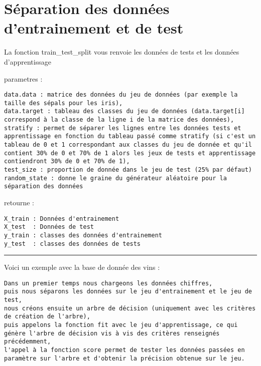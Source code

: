 \documentclass[11pt]{article}
\begin{document}
    \section{Séparation des données d'entrainement et de
test}\label{suxe9paration-des-donnuxe9es-dentrainement-et-de-test}

La fonction train\_test\_split vous renvoie les données de tests et les
données d'apprentissage

parametres :

\begin{verbatim}
data.data : matrice des données du jeu de données (par exemple la taille des sépals pour les iris),
data.target : tableau des classes du jeu de données (data.target[i] correspond à la classe de la ligne i de la matrice des données),
stratify : permet de séparer les lignes entre les données tests et apprentissage en fonction du tableau passé comme stratify (si c'est un tableau de 0 et 1 correspondant aux classes du jeu de donnée et qu'il contient 30% de 0 et 70% de 1 alors les jeux de tests et apprentissage contiendront 30% de 0 et 70% de 1),
test_size : proportion de donnée dans le jeu de test (25% par défaut)
random_state : donne le graine du générateur aléatoire pour la séparation des données
\end{verbatim}

retourne :

\begin{verbatim}
X_train : Données d'entrainement
X_test  : Données de test
y_train : classes des données d'entrainement
y_test  : classes des données de tests
\end{verbatim}

\begin{center}\rule{0.5\linewidth}{\linethickness}\end{center}

Voici un exemple avec la base de donnée des vins :

\begin{verbatim}
Dans un premier temps nous chargeons les données chiffres, 
puis nous séparons les données sur le jeu d'entrainement et le jeu de test,
nous créons ensuite un arbre de décision (uniquement avec les critères de création de l'arbre),
puis appelons la fonction fit avec le jeu d'apprentissage, ce qui génère l'arbre de décision vis à vis des critères renseignés précédemment,
l'appel à la fonction score permet de tester les données passées en paramètre sur l'arbre et d'obtenir la précision obtenue sur le jeu.
\end{verbatim}
\end{document}
